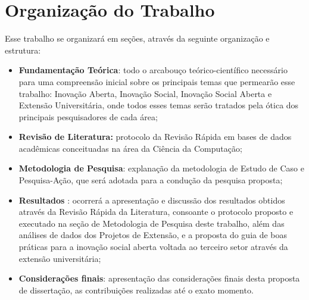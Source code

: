 \section{Organização do Trabalho}
\label{organizacao}

Esse trabalho se organizará em seções, através da seguinte organização e estrutura:
\par\vspace{1\baselineskip}

\begin{itemize}
    \item \textbf{Fundamentação Teórica}: todo o arcabouço teórico-científico necessário para uma compreensão inicial sobre os principais temas que permearão esse trabalho: Inovação Aberta, Inovação Social, Inovação Social Aberta e Extensão Universitária, onde todos esses temas serão tratados pela ótica dos principais pesquisadores de cada área;
    \item\textbf{Revisão de Literatura:} protocolo da Revisão Rápida em bases de dados acadêmicas conceituadas na área da Ciência da Computação;
    \item \textbf{Metodologia de Pesquisa}: explanação da metodologia de Estudo de Caso e Pesquisa-Ação, que será adotada para a condução da pesquisa proposta;
    \item \textbf{Resultados }: ocorrerá a apresentação e discussão dos resultados obtidos através da Revisão Rápida da Literatura, consoante o protocolo proposto e executado na seção de Metodologia de Pesquisa deste trabalho, além das análises de dados dos Projetos de Extensão, e a proposta do guia de boas práticas para a inovação social aberta voltada ao terceiro setor através da extensão universitária;
    \item \textbf{Considerações finais}: apresentação das considerações finais desta proposta de dissertação, as contribuições realizadas até o exato momento.

\end{itemize}







